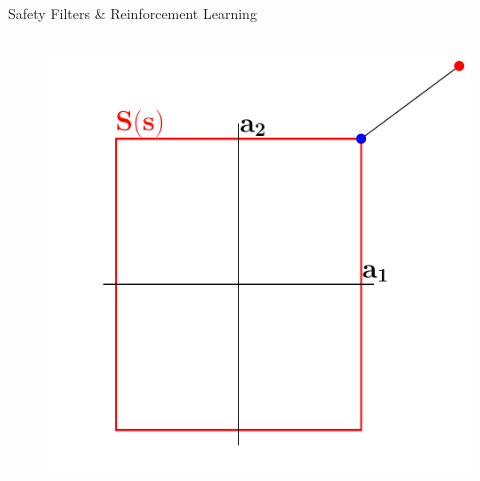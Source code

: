 \documentclass[lecture]{beamer}
\begin{document}
\begin{frame}{\normalsize Safety Filters \& Reinforcement Learning}
\begin{columns}[t]
\begin{overlayarea}{\textwidth}{.5\textheight}
\begin{figure}
{	}
	      \only<12->
        {
        \center
	\includegraphics[width=1\textwidth,clip]{Codes/SafetyFilters/Projection9.pdf}
	}
\end{figure}
\end{overlayarea}
	
\end{columns}

\end{frame}
\end{document}
